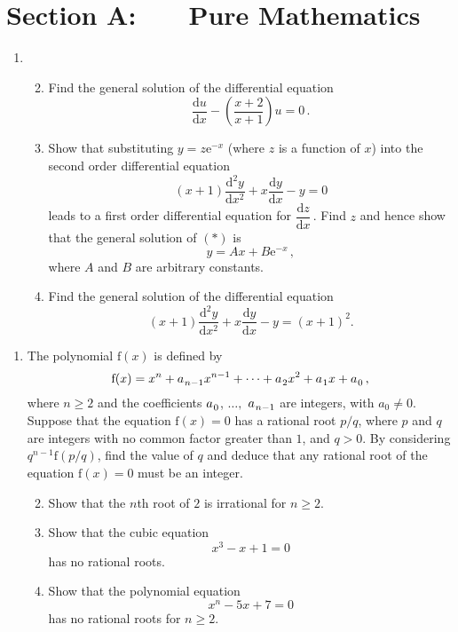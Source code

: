 \documentclass[a4, 11pt]{report}
\newlength{\qspace}
\newcounter{qnumber}
\newenvironment{question}%
 {\vspace{\qspace}
  \begin{enumerate}[\bfseries 1\quad][10]%
    \setcounter{enumi}{\value{qnumber}}%
    \item%
 }
{
  \end{enumerate}
  \filbreak
  \stepcounter{qnumber}
 }
\newenvironment{questionparts}[1][1]%
 {
  \begin{enumerate}[\bfseries (i)]%
    \setcounter{enumii}{#1}
    \addtocounter{enumii}{-1}
    \setlength{\itemsep}{5mm}
    \setlength{\parskip}{8pt}
 }
 {
  \end{enumerate}
 }
\def\d{{\mathrm d}}
\def\e{{\mathrm e}}
\def\f{{\mathrm f}}
\newcommand{\low}{^{\vphantom{()}}}
\def\ge{\geqslant}
\begin{document}
\setcounter{page}{2}

 
\section*{Section A: \ \ \ Pure Mathematics}

\begin{question}
\begin{questionparts}
\item
Find the general solution of the differential equation
\[
\frac{\d u}{\d x} - \left(\frac { x +2}{x+1}\right)u =0\,.
\]

\item Show that substituting
$y=z\e^{-x}$ (where $z$ is a function of $x$) into the 
second order differential equation
\[
(x+1) \frac{\d ^2 y}{\d x^2} + x \frac{\d y}{\d x} -y = 0
\tag{$*$}
\]
leads to a first order differential equation for $\dfrac{\d z}{\d x}\,$.
Find $z$ and hence show that the general solution of $(*)$ is 
\[
y= Ax + B\e^{-x}\,,
\]
where $A$ and $B$ are arbitrary constants.

\item Find the general solution of the differential equation
\[
(x+1) \frac{\d ^2 y}{\d x^2} + x \frac{\d y}{\d x} -y = 
(x+1)^2                                                             .
\]

\end{questionparts}
\end{question}

\begin{question}
The polynomial $\f(x)$ is defined by
\[
\f(x) =   x^n + a_{\low{n-1}}x^{n-1}
  + \cdots +     a_{\low2} x^2+  a_{\low1} x + a_{\low0}\,,
\]
where $n\ge2$ and the coefficients $a_{\low0}$, $\ldots,$ $a_{\low{n-1}}$ 
are integers, with $a_0\ne0$. 
 Suppose that the equation $\f(x)=0$ has a rational root
$p/q$, where $p$ and $q$ are integers
with no common factor greater than $1$, and $q>0$. 
By considering $q^{n-1}\f(p/q)$,
find the value of $q$ and deduce that any rational root of 
the equation $\f(x)=0$ must be an integer.

\begin{questionparts}
\item Show that the $n$th root of $2$ is irrational for $n\ge2$.

\item Show that 
 the cubic equation 
\[
x^3- x +1 =0
\]
has no rational roots.
\item
Show that 
the polynomial equation 
\[
x^n- 5x +7 =0
\]
has no rational roots for $n\ge2$.


\end{questionparts}
\end{question}
\end{document}
